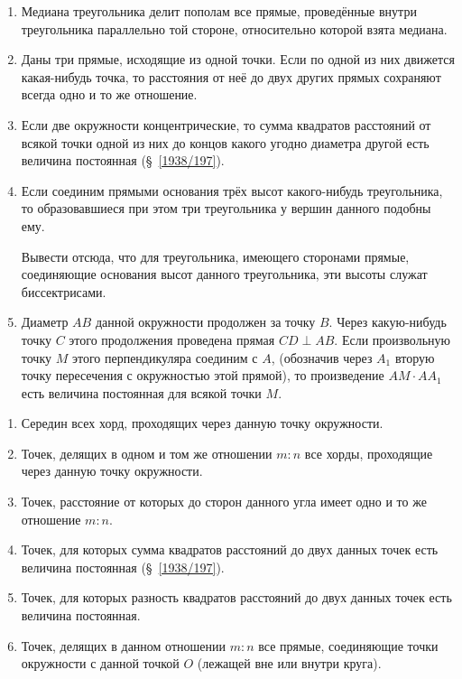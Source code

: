 \documentclass[oneside]{book}
\begin{document}
\begin{enumerate}
 \item
Медиана треугольника делит пополам все прямые, проведённые внутри треугольника параллельно той стороне, относительно которой взята медиана.

 \item
Даны три прямые, исходящие из одной точки.
Если по одной из них движется какая-нибудь точка, то расстояния от неё до двух других прямых сохраняют всегда одно и то же отношение.

 \item
Если две окружности концентрические, то сумма квадратов расстояний от всякой точки одной из них до концов какого угодно диаметра другой есть величина постоянная (§~\ref{1938/197}).

 \item
Если соединим прямыми основания трёх высот какого-нибудь треугольника, то образовавшиеся при этом три треугольника у вершин данного подобны ему.

Вывести отсюда, что для треугольника, имеющего сторонами прямые, соединяющие основания высот данного треугольника, эти высоты служат биссектрисами.

 \item
Диаметр $AB$ данной окружности продолжен за точку $B$.
Через какую-нибудь точку $C$ этого продолжения проведена прямая $CD\perp AB$.
Если произвольную точку $M$ этого перпендикуляра соединим с $A$, (обозначив через $A_1$ вторую точку пересечения с окружностью этой прямой), то произведение $AM\cdot  AA_1$ есть величина постоянная для всякой точки $M$.

\end{enumerate}

\begin{center}
\end{center}

\begin{enumerate}[resume]

 \item
Середин всех хорд, проходящих через данную точку окружности.

 \item
Точек, делящих в одном и том же отношении $m:n$ все хорды, проходящие через данную точку окружности.

\item \label{1938/upr-3-17}
Точек, расстояние от которых до сторон данного угла имеет одно и то же отношение $m:n$.

 \item
Точек, для которых сумма квадратов расстояний до двух данных точек есть величина постоянная (§~\ref{1938/197}).

 \item
Точек, для которых разность квадратов расстояний до двух данных точек есть величина постоянная.

 \item
Точек, делящих в данном отношении $m:n$ все прямые, соединяющие точки окружности с данной точкой $O$ (лежащей вне или внутри круга).

\end{enumerate}
\end{document}
